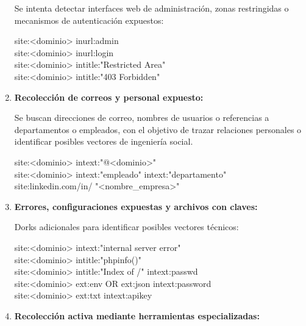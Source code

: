 \documentclass[a4paper, 11pt]{article}
\begin{document}
\begin{enumerate}
   Se intenta detectar interfaces web de administración, zonas restringidas o mecanismos de autenticación expuestos:

    \begin{tcolorbox}[colback=yellow!20!white, colframe=orange!80!black, title={Dorks para paneles y logins}]
    \small
    site:<dominio> inurl:admin \\
    site:<dominio> inurl:login \\
    site:<dominio> intitle:"Restricted Area" \\
    site:<dominio> intitle:"403 Forbidden"
    \end{tcolorbox}

    \item \textbf{Recolección de correos y personal expuesto:}

    Se buscan direcciones de correo, nombres de usuarios o referencias a departamentos o empleados, con el objetivo de trazar relaciones personales o identificar posibles vectores de ingeniería social.

    \begin{tcolorbox}[colback=yellow!20!white, colframe=orange!80!black, title={Dorks para emails y personal}]
    \small
    site:<dominio> intext:"@<dominio>" \\
    site:<dominio> intext:"empleado" \textbar{} intext:"departamento" \\
    site:linkedin.com/in/ "\textless nombre\_empresa\textgreater"
    \end{tcolorbox}

    \item \textbf{Errores, configuraciones expuestas y archivos con claves:}

    Dorks adicionales para identificar posibles vectores técnicos:

     \begin{tcolorbox}[colback=yellow!20!white, colframe=orange!80!black, title={Dorks para claves, errores y archivos críticos}]
    \small
    site:<dominio> intext:"internal server error" \\
    site:<dominio> intitle:"phpinfo()" \\
    site:<dominio> intitle:"Index of /" intext:passwd \\
    site:<dominio> ext:env OR ext:json intext:password \\
    site:<dominio> ext:txt intext:apikey
    \end{tcolorbox}

    \item \textbf{Recolección activa mediante herramientas especializadas:}


\end{enumerate}
\end{document}

